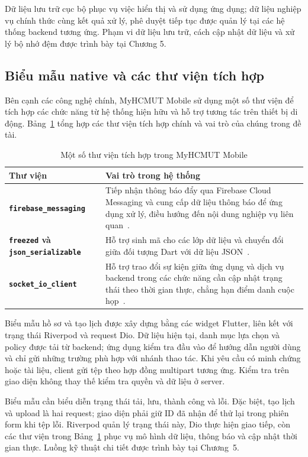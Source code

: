 Dữ liệu lưu trữ cục bộ phục vụ việc hiển thị và sử dụng ứng dụng; dữ liệu nghiệp vụ chính thức cùng kết quả xử lý, phê duyệt tiếp tục được quản lý tại các hệ thống backend tương ứng. Phạm vi dữ liệu lưu trữ, cách cập nhật dữ liệu và xử lý bộ nhớ đệm được trình bày tại Chương 5.

\subsection{Biểu mẫu native và các thư viện tích hợp}
\label{subsec:integrated_libraries}

Bên cạnh các công nghệ chính, MyHCMUT Mobile sử dụng một số thư viện để tích hợp các chức năng từ hệ thống hiện hữu và hỗ trợ tương tác trên thiết bị di động. Bảng~\ref{tab:integrated_libraries} tổng hợp các thư viện tích hợp chính và vai trò của chúng trong đề tài.

\begin{table}[H]
\centering
\small
\caption{Một số thư viện tích hợp trong MyHCMUT Mobile}
\label{tab:integrated_libraries}
\begin{tabularx}{\textwidth}{|>{\raggedright\arraybackslash\bfseries}p{4cm}|>{\raggedright\arraybackslash}X|}
\hline
\textbf{Thư viện} & \textbf{Vai trò trong hệ thống} \\
\hline

\texttt{firebase\_messaging} & Tiếp nhận thông báo đẩy qua Firebase Cloud Messaging và cung cấp dữ liệu thông báo để ứng dụng xử lý, điều hướng đến nội dung nghiệp vụ liên quan~\cite{fcm_doc}. \\
\hline
\texttt{freezed} và \texttt{json\_serializable} & Hỗ trợ sinh mã cho các lớp dữ liệu và chuyển đổi giữa đối tượng Dart với dữ liệu JSON~\cite{freezed_doc}. \\
\hline
\texttt{socket\_io\_client} & Hỗ trợ trao đổi sự kiện giữa ứng dụng và dịch vụ backend trong các chức năng cần cập nhật trạng thái theo thời gian thực, chẳng hạn điểm danh cuộc họp~\cite{socketio_doc}. \\
\hline
\end{tabularx}
\end{table}

Biểu mẫu hồ sơ và tạo lịch được xây dựng bằng các widget Flutter, liên kết với trạng thái Riverpod và request Dio. Dữ liệu hiện tại, danh mục lựa chọn và policy được tải từ backend; ứng dụng kiểm tra đầu vào để hướng dẫn người dùng và chỉ gửi những trường phù hợp với nhánh thao tác. Khi yêu cầu có minh chứng hoặc tài liệu, client gửi tệp theo hợp đồng multipart tương ứng. Kiểm tra trên giao diện không thay thế kiểm tra quyền và dữ liệu ở server.

Biểu mẫu cần biểu diễn trạng thái tải, lưu, thành công và lỗi. Đặc biệt, tạo lịch và upload là hai request; giao diện phải giữ ID đã nhận để thử lại trong phiên form khi tệp lỗi. Riverpod quản lý trạng thái này, Dio thực hiện giao tiếp, còn các thư viện trong Bảng~\ref{tab:integrated_libraries} phục vụ mô hình dữ liệu, thông báo và cập nhật thời gian thực. Luồng kỹ thuật chi tiết được trình bày tại Chương~5.
